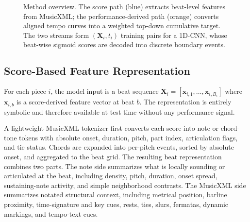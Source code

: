 \documentclass{article}
\begin{document}
\begin{figure}[t]
  \caption{Method overview. The score path (blue) extracts beat-level features from MusicXML; the performance-derived path (orange) converts aligned tempo curves into a weighted top-down cumulative target. The two streams form $(\mathbf{X}_i, t_i)$ training pairs for a 1D-CNN, whose beat-wise sigmoid scores are decoded into discrete boundary events.}
  \label{fig:method_pipeline}
\end{figure}

\subsection{Score-Based Feature Representation}\label{subsec:score_features}

For each piece $i$, the model input is a beat sequence $\mathbf{X}_i = [\mathbf{x}_{i,1}, \ldots, \mathbf{x}_{i,B_i}]$ where $\mathbf{x}_{i,b}$ is a score-derived feature vector at beat $b$. The representation is entirely symbolic and therefore available at test time without any performance signal.

A lightweight MusicXML tokenizer first converts each score into note or chord-tone tokens with absolute onset, duration, pitch, part index, articulation flags, and tie status. Chords are expanded into per-pitch events, sorted by absolute onset, and aggregated to the beat grid. The resulting beat representation combines two parts. The note side summarizes what is locally sounding or articulated at the beat, including density, pitch, duration, onset spread, sustaining-note activity, and simple neighborhood contrasts. The MusicXML side summarizes notated structural context, including metrical position, barline proximity, time-signature and key cues, rests, ties, slurs, fermatas, dynamic markings, and tempo-text cues.
\end{document}
